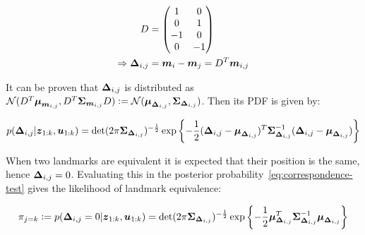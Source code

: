 \begin{align}
D &= \begin{pmatrix}
1 & 0\\
0 & 1\\
-1 & 0\\
0 & -1
\end{pmatrix}\\
\Rightarrow 
\boldsymbol{\Delta}_{i,j}&=\boldsymbol{m}_i-\boldsymbol{m}_j = D^T\boldsymbol{m}_{i,j}
\end{align}

It can be proven that $\boldsymbol{\Delta}_{i,j}$ is distributed as $\mathcal{N}(D^T\boldsymbol{\mu}_{\boldsymbol{m}_{i,j}}, D^T \boldsymbol{\Sigma}_{\boldsymbol{m}_{i,j}} D)\vcentcolon= \mathcal{N}(\boldsymbol{\mu}_{\boldsymbol{\Delta}_{i,j}}, \boldsymbol{\Sigma}_{\boldsymbol{\Delta}_{i,j}})$. Then its PDF is given by:


\begin{equation}
p(\boldsymbol{\Delta}_{i,j}|\boldsymbol{z}_{1:k},\boldsymbol{u}_{1:k})=
\det(2\pi \boldsymbol{\Sigma}_{\boldsymbol{\Delta}_{i,j}})^{-\frac{1}{2}}\exp\left\lbrace -\frac{1}{2}(\boldsymbol{\Delta}_{i,j}-\boldsymbol{\mu}_{\boldsymbol{\Delta}_{i,j}})^T
\boldsymbol{\Sigma}_{\boldsymbol{\Delta}_{i,j}}^{-1}(\boldsymbol{\Delta}_{i,j}-\boldsymbol{\mu}_{\boldsymbol{\Delta}_{i,j}})\right\rbrace
\label{eq:correspondence-test}
\end{equation}



When two landmarks are equivalent it is expected that their position is the same, hence $\boldsymbol{\Delta}_{i,j}=0$. Evaluating this in the posterior probability~\eqref{eq:correspondence-test} gives the likelihood of landmark equivalence:

\begin{equation}
\pi_{j=k} \vcentcolon=
p(\boldsymbol{\Delta}_{i,j}=0|\boldsymbol{z}_{1:k},\boldsymbol{u}_{1:k})=
\det(2\pi\boldsymbol{\Sigma}_{\boldsymbol{\Delta}_{i,j}})^{-\frac{1}{2}}
\exp\left\lbrace-\frac{1}{2}\boldsymbol{\mu}_{\boldsymbol{\Delta}_{i,j}}^T\boldsymbol{\Sigma}_{\boldsymbol{\Delta}_{i,j}}^{-1}\boldsymbol{\mu}_{\boldsymbol{\Delta}_{i,j}}\right\rbrace
\label{eq:landmark-equivalence}
\end{equation}

